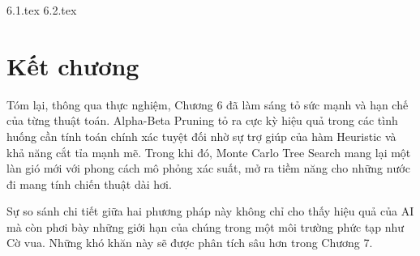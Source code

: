 {6.1.tex}
{6.2.tex}

\section{Kết chương}

Tóm lại, thông qua thực nghiệm, Chương 6 đã làm sáng tỏ sức mạnh và hạn chế của từng thuật toán. Alpha-Beta Pruning tỏ ra cực kỳ hiệu quả trong các tình huống cần tính toán chính xác tuyệt đối nhờ sự trợ giúp của hàm Heuristic và khả năng cắt tỉa mạnh mẽ. Trong khi đó, Monte Carlo Tree Search mang lại một làn gió mới với phong cách mô phỏng xác suất, mở ra tiềm năng cho những nước đi mang tính chiến thuật dài hơi.

Sự so sánh chi tiết giữa hai phương pháp này không chỉ cho thấy hiệu quả của AI mà còn phơi bày những giới hạn của chúng trong một môi trường phức tạp như Cờ vua. Những khó khăn này sẽ được phân tích sâu hơn trong Chương 7.
